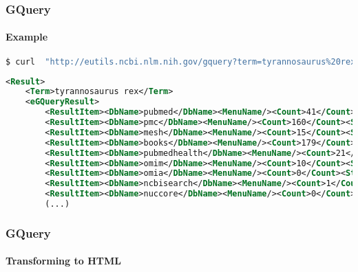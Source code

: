 \documentclass{beamer}
\begin{document}
\begin{frame}[fragile]
\frametitle{GQuery}
\framesubtitle{Example}
\begin{lstlisting}[language=bash,basicstyle=\tiny,breaklines=true,escapechar=\!]
$ curl  "http://eutils.ncbi.nlm.nih.gov/gquery?term=tyrannosaurus%20rex&retmode=xml"
\end{lstlisting}

\begin{lstlisting}[language=xml,basicstyle=\tiny,breaklines=true,escapechar=\%]
<Result>
    <Term>tyrannosaurus rex</Term>
    <eGQueryResult>
        <ResultItem><DbName>pubmed</DbName><MenuName/><Count>41</Count><Status>Ok</Status></ResultItem>
        <ResultItem><DbName>pmc</DbName><MenuName/><Count>160</Count><Status>Ok</Status></ResultItem>
        <ResultItem><DbName>mesh</DbName><MenuName/><Count>15</Count><Status>Ok</Status></ResultItem>
        <ResultItem><DbName>books</DbName><MenuName/><Count>179</Count><Status>Ok</Status></ResultItem>
        <ResultItem><DbName>pubmedhealth</DbName><MenuName/><Count>21</Count><Status>Ok</Status></ResultItem>
        <ResultItem><DbName>omim</DbName><MenuName/><Count>10</Count><Status>Ok</Status></ResultItem>
        <ResultItem><DbName>omia</DbName><MenuName/><Count>0</Count><Status>Term or Database is not found</Status></ResultItem>
        <ResultItem><DbName>ncbisearch</DbName><MenuName/><Count>1</Count><Status>Ok</Status></ResultItem>
        <ResultItem><DbName>nuccore</DbName><MenuName/><Count>0</Count><Status>Term or Database is not found</Status></ResultItem>
        (...)
\end{lstlisting}
\end{frame}


\begin{frame}[fragile]
\frametitle{GQuery}
\framesubtitle{Transforming to HTML}

\end{frame}
\end{document}
